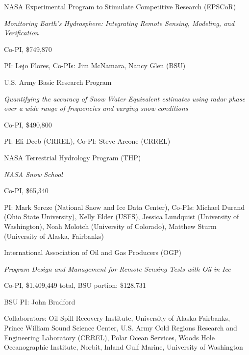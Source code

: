 \documentclass[11pt]{article}
\renewenvironment{itemize}{
  \begin{list}{}{
    \setlength{\leftmargin}{1.5em}
    \setlength{\itemsep}{0pt}
    \setlength{\parskip}{0pt}
  }
}{
  \end{list}
}
\begin{document}
\begin{itemize}
\item[6/2014-6/2018] NASA Experimental Program to Stimulate Competitive Research (EPSCoR)
\begin{itemize}
\item \textit{Monitoring Earth's Hydrosphere: Integrating Remote Sensing, Modeling, and Verification}
\item Co-PI, \$749,870
\item PI: Lejo Flores, Co-PIs: Jim McNamara, Nancy Glen (BSU)
\end{itemize}

\item[10/2013-9/2016] U.S. Army Basic Research Program
\begin{itemize}
\item \textit{Quantifying the accuracy of Snow Water Equivalent estimates using radar phase over a wide range of frequencies and varying snow conditions}
\item Co-PI, \$490,800
\item PI: Eli Deeb (CRREL), Co-PI: Steve Arcone (CRREL)
\end{itemize}

\item[1/2014-12/2014] NASA Terrestrial Hydrology Program (THP)
\begin{itemize}
\item \textit{NASA Snow School}
\item Co-PI, \$65,340
\item PI: Mark Sereze (National Snow and Ice Data Center), Co-PIs: Michael Durand (Ohio State University), Kelly Elder (USFS),
Jessica Lundquist (University of Washington), Noah Molotch (University of Colorado), Matthew Sturm (University of Alaska, Fairbanks)
\end{itemize}

\item[01/2014-12/2014] International Association of Oil and Gas Producers (OGP)
\begin{itemize}
\item \textit{Program Design and Management for Remote Sensing Tests with Oil in Ice}
\item Co-PI, \$1,409,449 total, BSU portion: \$128,731
\item BSU PI: John Bradford
\item Collaborators: Oil Spill Recovery Institute, University of Alaska Fairbanks, Prince William Sound Science Center, U.S. Army Cold Regions Research and Engineering Laboratory (CRREL), Polar Ocean Services, Woods Hole Oceanographic Institute, Norbit, Inland Gulf Marine, University of Washington
\end{itemize}


\end{itemize}
\end{document}
